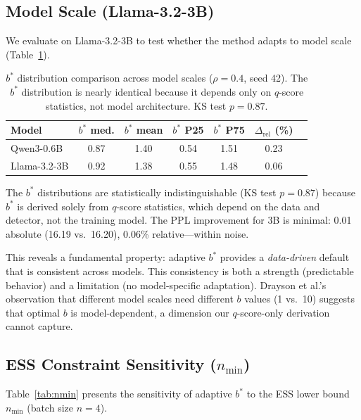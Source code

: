 \documentclass[11pt]{article}
\begin{document}
\subsection{Model Scale (Llama-3.2-3B)}
\label{sec:3b}

We evaluate on Llama-3.2-3B to test whether the method adapts to model scale (Table~\ref{tab:3b}).

\begin{table}[t]
\centering
\caption{$b^*$ distribution comparison across model scales ($\rho = 0.4$, seed 42). The $b^*$ distribution is nearly identical because it depends only on $q$-score statistics, not model architecture. KS test $p = 0.87$.}
\label{tab:3b}
\small
\begin{tabular}{lcccccc}
\toprule
Model & $b^*$ med. & $b^*$ mean & $b^*$ P25 & $b^*$ P75 & $\Delta_{\mathrm{rel}}$ (\%) \\
\midrule
Qwen3-0.6B   & 0.87 & 1.40 & 0.54 & 1.51 & 0.23 \\
Llama-3.2-3B & 0.92 & 1.38 & 0.55 & 1.48 & 0.06 \\
\bottomrule
\end{tabular}
\end{table}

The $b^*$ distributions are statistically indistinguishable (KS test $p = 0.87$) because $b^*$ is derived solely from $q$-score statistics, which depend on the data and detector, not the training model.
The PPL improvement for 3B is minimal: 0.01 absolute (16.19 vs.\ 16.20), 0.06\% relative---within noise.

This reveals a fundamental property: adaptive $b^*$ provides a \emph{data-driven} default that is consistent across models.
This consistency is both a strength (predictable behavior) and a limitation (no model-specific adaptation).
Drayson et al.'s observation that different model scales need different $b$ values (1 vs.\ 10) suggests that optimal $b$ is model-dependent, a dimension our $q$-score-only derivation cannot capture.

\subsection{ESS Constraint Sensitivity ($n_{\min}$)}
\label{sec:nmin}

Table~\ref{tab:nmin} presents the sensitivity of adaptive $b^*$ to the ESS lower bound $n_{\min}$ (batch size $n = 4$).
\end{document}
